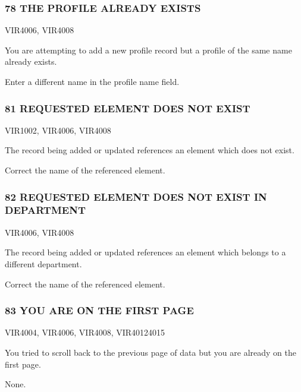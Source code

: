 \documentclass[letterpaper,10pt,english]{sphinxmanual}
\begin{document}
\subsubsection{78 THE PROFILE ALREADY EXISTS}
\label{\detokenize{messages:the-profile-already-exists}}\begin{description}
\sphinxAtStartPar
VIR4006, VIR4008

\sphinxAtStartPar
You are attempting to add a new profile record but a profile of the same name already exists.

\sphinxAtStartPar
Enter a different name in the profile name field.

\end{description}


\subsubsection{81 REQUESTED ELEMENT DOES NOT EXIST}
\label{\detokenize{messages:requested-element-does-not-exist}}\begin{description}
\sphinxAtStartPar
VIR1002, VIR4006, VIR4008

\sphinxAtStartPar
The record being added or updated references an element which does not exist.

\sphinxAtStartPar
Correct the name of the referenced element.

\end{description}


\subsubsection{82 REQUESTED ELEMENT DOES NOT EXIST IN DEPARTMENT}
\label{\detokenize{messages:requested-element-does-not-exist-in-department}}\begin{description}
\sphinxAtStartPar
VIR4006, VIR4008

\sphinxAtStartPar
The record being added or updated references an element which belongs to a different department.

\sphinxAtStartPar
Correct the name of the referenced element.

\end{description}


\subsubsection{83 YOU ARE ON THE FIRST PAGE}
\label{\detokenize{messages:id4}}\begin{description}
\sphinxAtStartPar
VIR4004, VIR4006, VIR4008, VIR4012\sphinxhyphen{}4015

\sphinxAtStartPar
You tried to scroll back to the previous page of data but you are already on the first page.

\sphinxAtStartPar
None.

\end{description}
\end{document}
